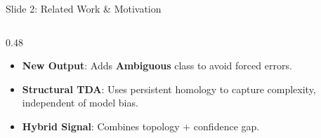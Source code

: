 \documentclass[aspectratio=169]{beamer}
\begin{document}
\begin{frame}[label=slide2]{Slide 2: Related Work \& Motivation}
\begin{columns}[T]
\begin{column}{0.48\textwidth}
\vspace*{-0.1cm}

\begin{tcolorbox}[tdabox,title=How Your Project Solves It,height=3.6cm]
\scriptsize
\begin{itemize}
    \item \textbf{New Output}: Adds \textbf{Ambiguous} class to avoid forced errors.
    \item \textbf{Structural TDA}: Uses persistent homology to capture complexity, independent of model bias.
    \item \textbf{Hybrid Signal}: Combines topology + confidence gap.
\end{itemize}
\end{tcolorbox}
\end{column}
\end{columns}
\end{frame}
\end{document}
